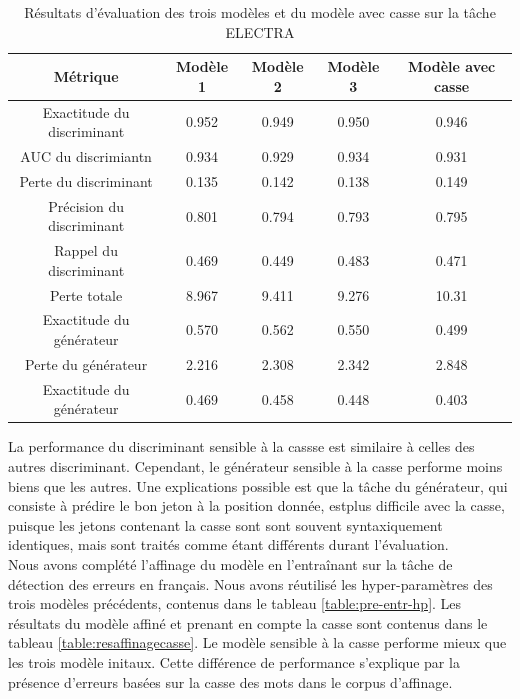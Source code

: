 \documentclass[12pt,twoside,maitrise]{dms}
\theoremstyle{definition}
\numberwithin{equation}{section}
\numberwithin{table}{chapter}
\numberwithin{figure}{chapter}
\begin{document}
\begin{table}[h!]
	\centering
	\begin{tabular}{||c | c c c c||}
		\hline
		Métrique                   & Modèle 1 & Modèle 2 & Modèle 3 & Modèle avec casse \\ [0.5ex]
		\hline\hline
		Exactitude du discriminant & 0.952    & 0.949    & 0.950    & 0.946             \\
		AUC du discrimiantn        & 0.934    & 0.929    & 0.934    & 0.931             \\
		Perte du discriminant      & 0.135    & 0.142    & 0.138    & 0.149             \\
		Précision du discriminant  & 0.801    & 0.794    & 0.793    & 0.795             \\
		Rappel du discriminant     & 0.469    & 0.449    & 0.483    & 0.471             \\
		Perte totale               & 8.967    & 9.411    & 9.276    & 10.31             \\
		Exactitude du générateur   & 0.570    & 0.562    & 0.550    & 0.499             \\
		Perte du générateur        & 2.216    & 2.308    & 2.342    & 2.848             \\
		Exactitude du générateur   & 0.469    & 0.458    & 0.448    & 0.403             \\
		\hline
	\end{tabular}
	\caption{Résultats d'évaluation des trois modèles et du modèle avec casse sur la tâche ELECTRA}
	\label{table:respreentrainementaveccasse}
\end{table}

La performance du discriminant sensible à la cassse est similaire à celles des
autres discriminant. Cependant, le générateur sensible à la casse performe
moins biens que les autres. Une explications possible est que la tâche du
générateur, qui consiste à prédire le bon jeton à la position donnée, estplus
difficile avec la casse, puisque les jetons contenant la casse sont sont
souvent syntaxiquement identiques, mais sont traités comme étant différents
durant l'évaluation.\\

Nous avons complété l'affinage du modèle en l'entraînant sur la tâche de
détection des erreurs en français. Nous avons réutilisé les hyper-paramètres
des trois modèles précédents, contenus dans le tableau \ref{table:pre-entr-hp}.
Les résultats du modèle affiné et prenant en compte la casse sont contenus dans
le tableau \ref{table:resaffinagecasse}. Le modèle sensible à la casse performe
mieux que les trois modèle initaux. Cette différence de performance s'explique
par la présence d'erreurs basées sur la casse des mots dans le corpus
d'affinage.
\end{document}
